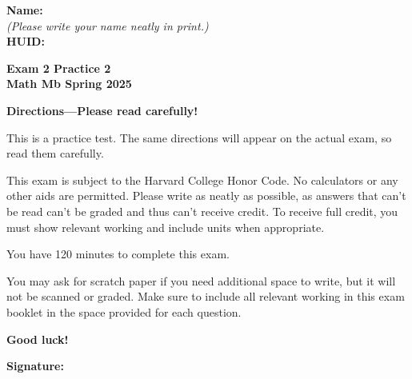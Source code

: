 \documentclass{article}
\begin{document}
{\large \mbox{} \hfill \bf Name:\underline{\hspace{3in}}}\\[2pt]
{\mbox{} \hfill \it (Please write your name neatly in print.)}\\[12pt]
{\large \mbox{} \hfill \bf HUID:\underline{\hspace{3in}}}
 
\medskip
 
\noindent
{\large\bf
Exam 2 Practice 2\\
Math Mb Spring 2025}
\noindent


{\Large
\begin{center}\textbf{Directions---Please read carefully!} \end{center}}

This is a practice test. The same directions will appear on the actual exam, so read them carefully.

\hrulefill 


This exam is subject to the Harvard College Honor Code. No calculators or any other aids are permitted.  Please write as neatly as possible, as answers that can't be read can't be graded and thus can't receive credit. To receive full credit, you must show relevant working
and include units when appropriate. 

You have 120 minutes to complete this exam. 

You may ask for scratch paper if you need additional space to write, but it will not be scanned or graded. Make sure to include all relevant working in this exam booklet in the space provided for each question.

\begin{center}\textbf{Good luck!}\end{center}


\vfill

\vspace{0.3in}

{\large \mbox{} \hfill \bf Signature:\underline{\hspace{3in}}}
\thispagestyle{empty}

\newpage
\end{document}
